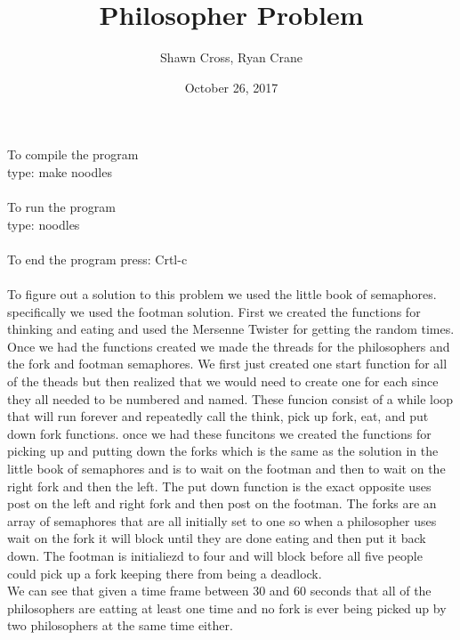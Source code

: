 \documentclass[letterpaper,10pt,titlepage]{article}
\begin{document}
\title{Philosopher Problem}
\date{October 26, 2017}
\author{Shawn Cross, Ryan Crane}
\maketitle

To compile the program\\

type: make noodles\\\\

To run the program\\

type: noodles\\\\

To end the program press: Crtl-c\\\\

To figure out a solution to this problem we used the little book of semaphores. 
specifically we used the footman solution. First we created the functions for 
thinking and eating and used the Mersenne Twister for getting the random times. 
Once we had the functions created we made the threads for the philosophers and 
the fork and footman semaphores. We first just created one start function for 
all of the theads but then realized that we would need to create one for each 
since they all needed to be numbered and named. These funcion consist of a 
while loop that will run forever and repeatedly call the think, pick up fork, 
eat, and put down fork functions. once we had these funcitons we created the 
functions for picking up and putting down the forks which is the same as the 
solution in the little book of semaphores and is to wait on the footman and 
then to wait on the right fork and then the left. The put down function is 
the exact opposite uses post on the left and right fork and then post on the 
footman. The forks are an array of semaphores that are all initially set to 
one so when a philosopher uses wait on the fork it will block until they are 
done eating and then put it back down. The footman is initialiezd to four and 
will block before all five people could pick up a fork keeping there from being 
a deadlock.\\ 

We can see that given a time frame between 30 and 60 seconds that all of the 
philosophers are eatting at least one time and no fork is ever being picked 
up by two philosophers at the same time either. 
\end{document}
